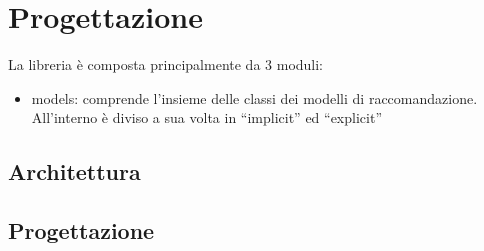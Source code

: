 \chapter{Progettazione}

La libreria è composta principalmente da 3 moduli:

\begin{itemize}
    \item models: comprende l'insieme delle classi dei modelli di raccomandazione. All'interno è diviso a sua volta in ``implicit'' ed ``explicit''
\end{itemize}

\section{Architettura}

\section{Progettazione}

